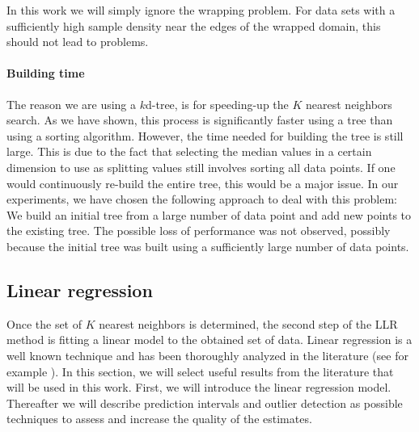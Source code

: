 In this work we will simply ignore the wrapping problem. For data sets with a sufficiently high sample density near the edges of the wrapped domain, this should not lead to problems.

\paragraph{Building time} The reason we are using a $k$d-tree, is for speeding-up the $K$ nearest neighbors search. As we have shown, this process is significantly faster using a tree than using a sorting algorithm. However, the time needed for building the tree is still large. This is due to the fact that selecting the median values in a certain dimension to use as splitting values still involves sorting all data points. If one would continuously re-build the entire tree, this would be a major issue. In our experiments, we have chosen the following approach to deal with this problem: We build an initial tree from a large number of data point and add new points to the existing tree. The possible loss of performance was not observed, possibly because the initial tree was built using a sufficiently large number of data points.







\subsection{Linear regression}\label{sec:LLR-linear regression}
Once the set of $K$ nearest neighbors is determined, the second step of the \ac{LLR} method is fitting a linear model to the obtained set of data. Linear regression is a well known technique and has been thoroughly analyzed in the literature (see for example \cite{Rencher:08}). In this section, we will select useful results from the literature that will be used in this work. First, we will introduce the linear regression model. Thereafter we will describe prediction intervals and outlier detection as possible techniques to assess and increase the quality of the estimates.




